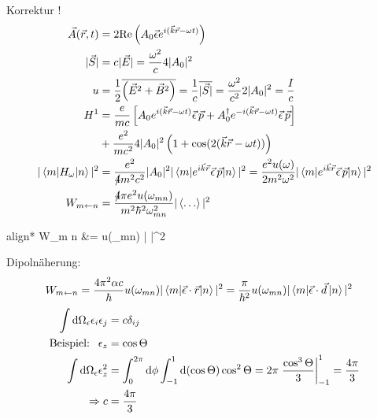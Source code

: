		Korrektur ! 
		\begin{align*}
		\vec{A} (\vec{r} , t) &=
		2 \mathrm{Re} \left(
		A_0 \vec{\epsilon} e^{i (\vec{k} \vec{r} - \omega t)}
		\right) \\
		|\vec{S}| &=
		c |\vec{E}| = \frac{\omega^2}{c} 4 |A_0|^2 \\
		u &= \frac{1}{2} \overline{\left( \vec{E}^2 + \vec{B}^2 \right)} 
		= \frac{1}{c} \overline{|\vec{S}|} 
		= \frac{\omega^2}{c^2} 2 |A_0|^2 = \frac{I}{c} \\
		H^1 &= \frac{e}{mc} \left[
		A_0 e^{i (\vec{k} \vec{r} - \omega t)} \vec{\epsilon} \,\vec{p} 
		+ A_0^\dagger e^{-i (\vec{k} \vec{r} - \omega t)} \vec{\epsilon} \,\vec{p}
		\right] \\
		&+ \frac{e^2}{m c^2} 4 |A_0|^2 \left( 1 + \cos (2 (\vec{k} \vec{r} - \omega t))\right) \\
		| \braket{m | H_\omega | n} |^2 &=	
		\frac{e^2}{4\!\!\!/ m^2 c^2} |A_0|^2
		| \braket{m | e^{i \vec{k} \vec{r}} \vec{\epsilon} \,\vec{p} | n} |^2 
		= \frac{e^2 u(\omega)}{2 m^2 \omega^2} 
		| \braket{m | e^{i \vec{k} \vec{r}} \vec{\epsilon} \,\vec{p} | n} |^2 \\
		W_{m \leftarrow n} &= \frac{4\!\!\!/ \pi e^2 u(\omega_{mn})}{m^2 \hbar^2 \omega_{mn}^2}
		|\braket{\ldots}|^2
		\end{align*}
		\begin{empheq}[box=\boxed]{align*}
		W_{m \leftarrow n} &=
		 u(\omega_{mn}) 
		|  |^2
		\end{empheq}
		Dipolnäherung:
		\begin{align*}
		W_{m \leftarrow n} &=
		\frac{4 \pi^2 \alpha c}{\hbar} u(\omega_{mn}) 
		| \braket{m | \vec{\epsilon} \cdot \vec{r} | n} |^2 
		= \frac{\pi}{\hbar^2} u(\omega_{mn}) 
		| \braket{m | \vec{\epsilon} \cdot \vec{d} \,| n} |^2
		\end{align*}
		\begin{align*}
		\int \mathrm{d} \Omega_\epsilon \epsilon_i \epsilon_j &= c \delta_{ij} \\
		\text{Beispiel: ~} \epsilon_z &= \cos \Theta \\
		\int \mathrm{d} \Omega_\epsilon \epsilon_z^2 &= 
		\int_{0}^{2 \pi} \mathrm{d} \phi \int_{-1}^{1} \mathrm{d} (\cos \Theta) \cos^2 \Theta 
		= 2 \pi \left. \frac{\cos^3 \Theta}{3} \right|_{-1}^1 = \frac{4 \pi}{3} \\
		\Rightarrow c &= \frac{4 \pi}{3} 
		\end{align*}
